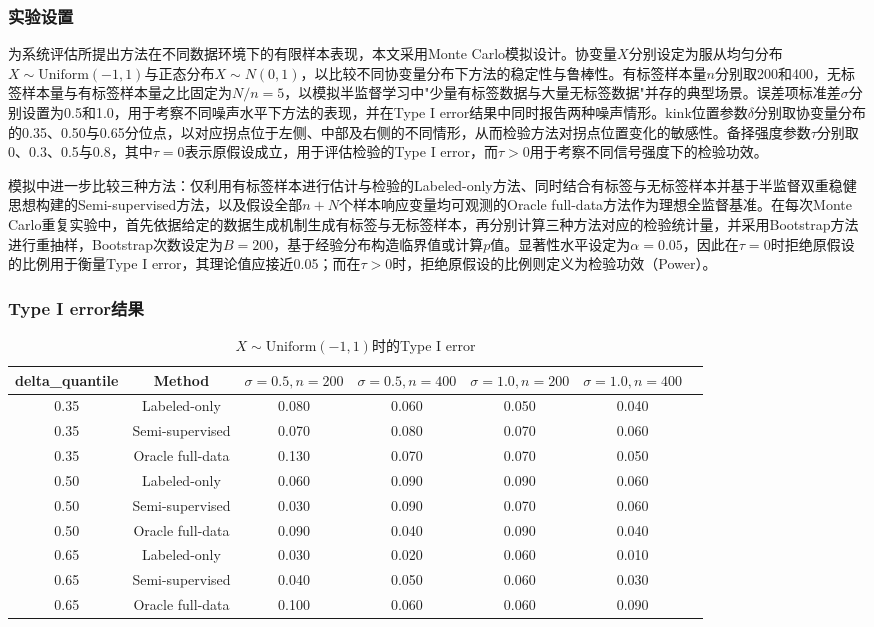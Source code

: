 \documentclass[12pt,a4paper]{ctexart}
\begin{document}
\subsubsection{实验设置}

为系统评估所提出方法在不同数据环境下的有限样本表现，本文采用Monte Carlo模拟设计。协变量$X$分别设定为服从均匀分布$X\sim\mathrm{Uniform}(-1,1)$与正态分布$X\sim N(0,1)$，以比较不同协变量分布下方法的稳定性与鲁棒性。有标签样本量$n$分别取200和400，无标签样本量与有标签样本量之比固定为$N/n=5$，以模拟半监督学习中"少量有标签数据与大量无标签数据"并存的典型场景。误差项标准差$\sigma$分别设置为0.5和1.0，用于考察不同噪声水平下方法的表现，并在Type I error结果中同时报告两种噪声情形。kink位置参数$\delta$分别取协变量分布的0.35、0.50与0.65分位点，以对应拐点位于左侧、中部及右侧的不同情形，从而检验方法对拐点位置变化的敏感性。备择强度参数$\tau$分别取0、0.3、0.5与0.8，其中$\tau=0$表示原假设成立，用于评估检验的Type I error，而$\tau>0$用于考察不同信号强度下的检验功效。

模拟中进一步比较三种方法：仅利用有标签样本进行估计与检验的Labeled-only方法、同时结合有标签与无标签样本并基于半监督双重稳健思想构建的Semi-supervised方法，以及假设全部$n+N$个样本响应变量均可观测的Oracle full-data方法作为理想全监督基准。在每次Monte Carlo重复实验中，首先依据给定的数据生成机制生成有标签与无标签样本，再分别计算三种方法对应的检验统计量，并采用Bootstrap方法进行重抽样，Bootstrap次数设定为$B=200$，基于经验分布构造临界值或计算$p$值。显著性水平设定为$\alpha=0.05$，因此在$\tau=0$时拒绝原假设的比例用于衡量Type I error，其理论值应接近0.05；而在$\tau>0$时，拒绝原假设的比例则定义为检验功效（Power）。

\subsubsection{Type I error结果}

\begin{table}[htbp]
\centering
\caption{$X \sim \mathrm{Uniform}(-1, 1)$时的Type I error}
\label{tab:type1_uniform}
\small
\begin{tabular}{ccccccc}
\toprule
delta\_quantile & Method & $\sigma=0.5, n=200$ & $\sigma=0.5, n=400$ & $\sigma=1.0, n=200$ & $\sigma=1.0, n=400$ \\
\midrule
0.35 & Labeled-only & 0.080 & 0.060 & 0.050 & 0.040 \\
0.35 & Semi-supervised & 0.070 & 0.080 & 0.070 & 0.060 \\
0.35 & Oracle full-data & 0.130 & 0.070 & 0.070 & 0.050 \\
\midrule
0.50 & Labeled-only & 0.060 & 0.090 & 0.090 & 0.060 \\
0.50 & Semi-supervised & 0.030 & 0.090 & 0.070 & 0.060 \\
0.50 & Oracle full-data & 0.090 & 0.040 & 0.090 & 0.040 \\
\midrule
0.65 & Labeled-only & 0.030 & 0.020 & 0.060 & 0.010 \\
0.65 & Semi-supervised & 0.040 & 0.050 & 0.060 & 0.030 \\
0.65 & Oracle full-data & 0.100 & 0.060 & 0.060 & 0.090 \\
\bottomrule
\end{tabular}
\end{table}
\end{document}
